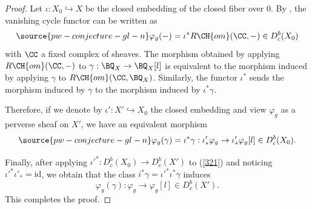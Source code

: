 \begin{proof}
Let $\iota: X_0 \hookrightarrow X$ be the closed embedding of the closed fiber over $0$. By \cite[Definition 8.6.2]{KS}, the vanishing cycle functor can be written as
\begin{equation}\label{vanishing}
\source{pw-conjecture-gl-n}
\varphi_g(-) = \iota^* R\CH{om}(\CC, -) \in D^b_c(X_0)
\end{equation}
with $\CC$ a fixed complex of sheaves. The morphism obtained
by applying $R\CH{om}(\CC, -)$ to $\gamma: \BQ_X \to \BQ_X[l]$
is equivalent to the morphism induced by applying $\gamma$ to $R\CH{om}(\CC, \BQ_X)$.
Similarly, the functor $\iota^*$ sends the morphism induced by $\gamma$
to the morphism induced by $\iota^*\gamma$.

Therefore, if we denote by $\iota': X' \hookrightarrow X_0$ the closed embedding and view $\varphi_g$ as a perverse sheaf on $X'$, we have an equivalent morphism
\begin{equation}\label{321}
\source{pw-conjecture-gl-n}
\varphi_g(\gamma) = \iota^*\gamma:  \iota'_*\varphi_g \to \iota'_*\varphi_g[l] \in D^b_c(X_0).
\end{equation}


Finally, after applying $\iota'^*: D^b_c(X_0) \rightarrow D^b_c(X')$ to (\ref{321}) and noticing $\iota'^*\iota'_*= \mathrm{id}$, we obtain that the class $i^*\gamma = \iota'^*\iota^*\gamma$ induces
\[
\varphi_g(\gamma): \varphi_g \to \varphi_g[l] \in D_c^b(X').
\]
This completes the proof.
\end{proof}


